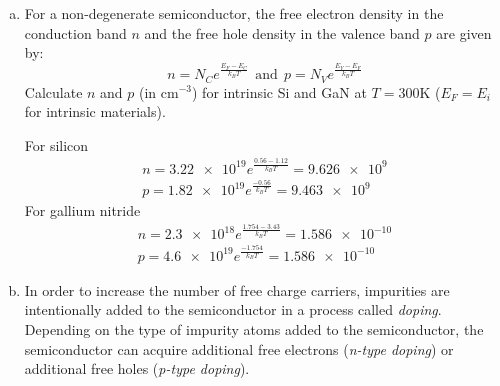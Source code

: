 \documentclass[10pt,letterpaper]{article}
\begin{document}
\begin{enumerate}
\begin{enumerate}[a)]
\color{violet}
The Fermi-Dirac distribution is $f(E) = \frac{1}{1 + e^{(E - E_{F})/k_{B}T}}$. First, $E_{F}$ needs to be calculated. For silicon
\begin{gather*}
E_{F} = \frac{1.12}{2} + \frac{k_{B}T}{2}\ln\left( \frac{\num{1.82e19}}{\num{3.22e19}} \right) = 0.56 \rightarrow f(E) = \frac{1}{1 + e^{(E - E_{F})/k_{B}T}} = \num{2.939e-10}
\end{gather*}
For gallium nitride
\begin{gather*}
E_{F} = \frac{3.43}{2} + \frac{k_{B}T}{2}\ln\left( \frac{\num{4.6e19}}{2.3e18} \right) = 1.754 \rightarrow f(E) = \frac{1}{1 + e^{(E - E_{F})/k_{B}T}} = \num{6.897e-29}
\end{gather*}
For silicon dioxide
\begin{gather*}
E_{F} = \frac{9}{2} = 4.5 \rightarrow f(E) = \frac{1}{1 + e^{(E - E_{F})/k_{B}T}} = \num{2.514e-76}
\end{gather*}
\color{black}

\item For a non-degenerate semiconductor, the free electron density in the conduction band $n$ and the free hole density in the valence band $p$ are given by:
$$n = N_{C}e^{\frac{E_{F} - E_{C}}{k_{B}T}}\ \ \text{and}\ \ p = N_{V}e^{\frac{E_{V} - E_{F}}{k_{B}T}}$$
Calculate $n$ and $p$ (in cm$^{-3}$) for intrinsic Si and GaN at $T = 300$K ($E_{F} = E_{i}$ for intrinsic materials).

\color{violet}
For silicon
\begin{gather*}
n = \num{3.22e19} e^{\frac{0.56 - 1.12}{k_{B}T}} = \num{9.626e9} \\
p = \num{1.82e19} e^{\frac{-0.56}{k_{B}T}} = \num{9.463e9}
\end{gather*}
For gallium nitride
\begin{gather*}
n = \num{2.3e18}e^{\frac{1.754 - 3.43}{k_{B}T}} = \num{1.586e-10} \\
p = \num{4.6e19}e^{\frac{-1.754}{k_{B}T}} = \num{1.586e-10}
\end{gather*}
\color{black}

\item In order to increase the number of free charge carriers, impurities are intentionally added to the semiconductor in a process called \textit{doping}. Depending on the type of impurity atoms added to the semiconductor, the semiconductor can acquire additional free electrons (\textit{n-type doping}) or additional free holes (\textit{p-type doping}).

\begin{enumerate}[a)]


\end{enumerate}
\end{enumerate}
\end{enumerate}
\end{document}
